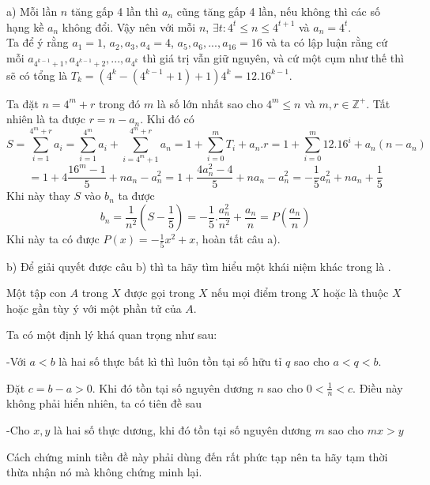 \documentclass[11pt]{scrartcl}
\begin{document}
\begin{itemize}[label=, leftmargin=0em, itemsep=0.5em]
    \begin{sol}
        a) Mỗi lần $n$ tăng gấp 4 lần thì $a_n$ cũng tăng gấp 4 lần, nếu không thì các số hạng kề $a_n$ không đổi. Vậy nên với mỗi $n$, $\exists t: 4^t \leq n \leq 4^{t + 1}$ và $a_n = 4^t$.\\
        Ta để ý rằng $a_1 = 1$, $a_2,a_3,a_4 = 4$, $a_5,a_6,...,a_{16} = 16$ và ta có lập luận rằng cứ mỗi $a_{4^{k-1} + 1},a_{4^{k-1} + 2},...,a_{4^k}$ thì giá trị vẫn giữ nguyên, và cứ một cụm như thế thì sẽ có tổng là $T_k = (4^{k} - (4^{k-1} + 1) + 1)4^k = 12.16^{k-1}$.


        Ta đặt $n = 4^m + r$ trong đó $m$ là số lớn nhất sao cho $4^m \leq n$ và $m,r \in \mathbb{Z}^+$. Tất nhiên là ta được $r = n - a_n$. Khi đó có 
        \[S = \sum_{i = 1}^{4^m + r} a_i = \sum_{i = 1}^{4^m}a_i + \sum_{i = 4^m + 1}^{4^m + r} a_n = 1 + \sum_{i = 0}^{m} T_i + a_n.r = 1 + \sum_{i = 0}^{m} 12.16^{i} + a_n(n - a_n)\]\[ = 1 + 4\frac{16^m - 1}{5}  + na_n - a_n^2 = 1 + \frac{4a_n^2 - 4}{5} +na_n -a_n^2 = -\frac{1}{5}a_n^2 + na_n + \frac{1}{5}\]
        Khi này thay $S$ vào $b_n$ ta được 
        \[b_n = \frac{1}{n^2}\left(S - \frac{1}{5}\right) = -\frac{1}{5}.\frac{a_n^2}{n^2} + \frac{a_n}{n} = P\left(\frac{a_n}{n}\right)\]
        Khi này ta có được $P(x) = -\frac{1}{5}x^2 + x$, hoàn tất câu a).


        b) Để giải quyết được câu b) thì ta hãy tìm hiểu một khái niệm khác trong  là .

        
         Một tập con $A$ trong $X$ được gọi  trong $X$ nếu mọi điểm trong $X$ hoặc là thuộc $X$ hoặc gần tùy ý với một phần tử của $A$.


        Ta có một định lý khá quan trọng như sau:
        \begin{theo}
            -Với $a < b$ là hai số thực bất kì thì luôn tồn tại số hữu tỉ $q$ sao cho $a < q < b$.
        \end{theo}
        Đặt $c = b - a > 0$. Khi đó tồn tại số nguyên dương $n$ sao cho $0 < \frac{1}{n} < c$. Điều này không phải hiển nhiên, ta có tiên đề sau
        \begin{theo}
            -Cho $x,y$ là hai số thực dương, khi đó tồn tại số nguyên dương $m$ sao cho $mx > y$
        \end{theo}
        Cách chứng minh tiền đề này phải dùng đến  rất phức tạp nên ta hãy tạm thời thừa nhận nó mà không chứng minh lại.




\end{sol}
\end{itemize}
\end{document}
